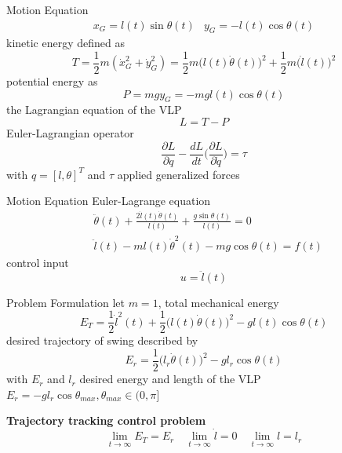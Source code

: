 \documentclass[10pt]{beamer}
\begin{document}
  \begin{frame}{Motion Equation}
    \begin{eqnarray*}
      x_G = l(t)\sin\theta(t) &  y_G = -l(t)\cos\theta(t) 
    \end{eqnarray*}
    kinetic energy defined as
    \begin{equation*}
      T = \frac{1}{2}m(\dot{x}_G^2+\dot{y}_G^2) = \frac{1}{2}m\big(l(t)\dot{\theta}(t)\big)^2+\frac{1}{2}m\big(\dot{l}(t)\big)^2 
    \end{equation*}
    potential energy as
    \begin{equation*}
      P = mgy_G = -mgl(t)\cos\theta(t)  
    \end{equation*}
    the Lagrangian equation of the VLP
    \begin{equation*}
      L = T-P
    \end{equation*}
    Euler-Lagrangian operator 
    \begin{equation*}\label{model}
      \frac{\partial L}{\partial q}   -\frac{dL}{dt}\Bigg(\frac{\partial L}{\partial \dot{q}}\Bigg) = \tau
    \end{equation*}
  with $q = [l, \theta]^T$ and $\tau$ applied generalized forces
  \end{frame}

  \begin{frame}{Motion Equation}
    Euler-Lagrange equation
    \begin{align*}
      &\ddot{\theta}(t)+\frac{2\dot{l}(t)\dot{\theta}(t)}{l(t)}+
        \frac{g\sin\theta(t)}{l(t)} = 0  \\
      &\ddot{l}(t)-ml(t)\dot{\theta}^2(t)-mg\cos\theta(t) = f(t)
    \end{align*}
    control input
    \begin{equation*}
      u = \ddot{l}(t)
    \end{equation*}
  \end{frame}

  \begin{frame}{Problem Formulation}
    let $m=1$, total mechanical energy
    \begin{equation*}
      E_T = %
        \frac{1}{2}\dot{l}^2(t)+\frac{1}{2}\big(l(t)\dot{\theta}(t)\big)^2-
        gl(t)\cos\theta(t) 
    \end{equation*}
    desired trajectory of swing described by
    \begin{equation*}
      E_r = \frac{1}{2}\big(l_r\dot{\theta}(t)\big)^2-gl_r\cos\theta(t) 
    \end{equation*}
    with $E_r$ and $l_r$ desired energy and length of the VLP
    \\
    $E_r = -gl_r\cos\theta_{max}, \theta_{max} \in (0,\pi]$

    \textbf{Trajectory tracking control problem}
    \begin{equation*}
      \lim_{t\rightarrow \infty} E_T = E_r  \quad
      \lim_{t\rightarrow \infty} \dot{l} = 0 \quad
      \lim_{t\rightarrow \infty} l = l_r
    \end{equation*}
  \end{frame}
\end{document}
